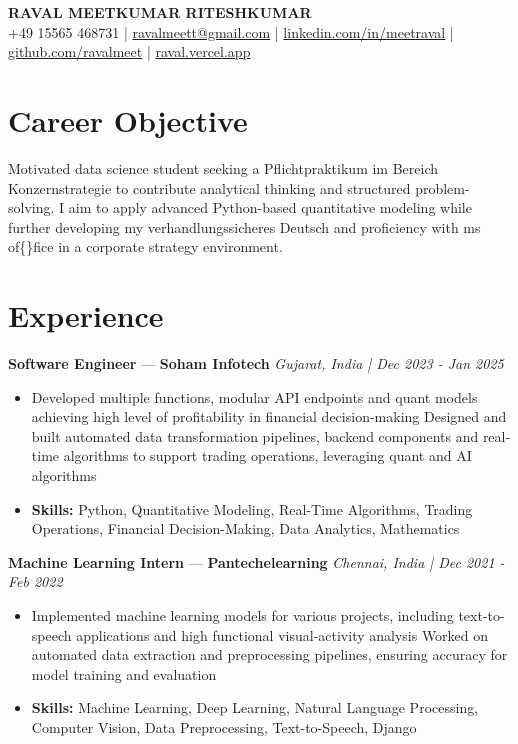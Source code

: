\documentclass[a4paper,10pt]{article}
\begin{document}
\begin{center}
  {\Large\bfseries RAVAL MEETKUMAR RITESHKUMAR}\\[2pt]
  {\small +49 15565 468731 \;|\; \href{mailto:ravalmeett@gmail.com}{ravalmeett@gmail.com} \;|\; \href{https://www.linkedin.com/in/meetraval/}{linkedin.com/in/meetraval} \;|\; \href{https://github.com/ravalmeet}{github.com/ravalmeet} \;|\; \href{https://raval.vercel.app/}{raval.vercel.app}}
\end{center}
\vspace{-3pt}

\section*{Career Objective}
Motivated data science student seeking a Pflichtpraktikum im Bereich Konzernstrategie to contribute analytical thinking and structured problem-solving. I aim to apply advanced Python-based quantitative modeling while further developing my verhandlungssicheres Deutsch and proficiency with ms of\{\}fice in a corporate strategy environment.\par

\section*{Experience}
\textbf{Software Engineer} — \textbf{Soham Infotech} \hfill \textit{Gujarat, India \;|\; Dec 2023 - Jan 2025}\par
\vspace{1pt}
\begin{itemize}
  \item Developed multiple functions, modular API endpoints and quant models achieving high level of profitability in financial decision-making Designed and built automated data transformation pipelines, backend components and real-time algorithms to support trading operations, leveraging quant and AI algorithms
  \item \textbf{Skills:} Python, Quantitative Modeling, Real-Time Algorithms, Trading Operations, Financial Decision-Making, Data Analytics, Mathematics
\end{itemize}
\vspace{3pt}
\textbf{Machine Learning Intern} — \textbf{Pantechelearning} \hfill \textit{Chennai, India \;|\; Dec 2021 - Feb 2022}\par
\vspace{1pt}
\begin{itemize}
  \item Implemented machine learning models for various projects, including text-to-speech applications and high functional visual-activity analysis Worked on automated data extraction and preprocessing pipelines, ensuring accuracy for model training and evaluation
  \item \textbf{Skills:} Machine Learning, Deep Learning, Natural Language Processing, Computer Vision, Data Preprocessing, Text-to-Speech, Django
\end{itemize}
\end{document}
